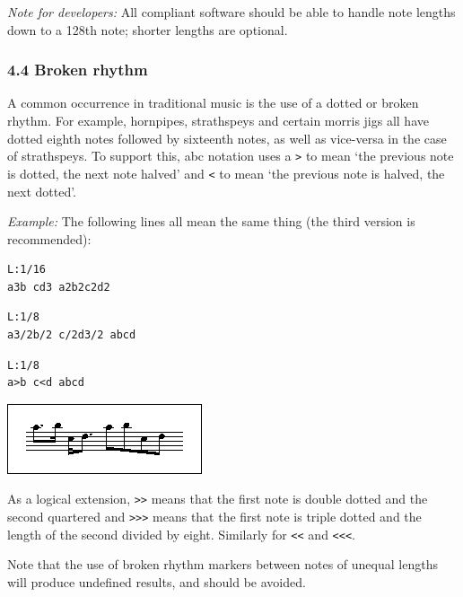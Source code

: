 \documentclass[oneside]{book}
\begin{document}
\emph{Note for developers:} All compliant software should be able to
handle note lengths down to a 128th note; shorter lengths are optional.

\hypertarget{broken_rhythm}{\subsubsection{4.4 Broken
rhythm}\label{broken_rhythm}}

A common occurrence in traditional music is the use of a dotted or
broken rhythm. For example, hornpipes, strathspeys and certain morris
jigs all have dotted eighth notes followed by sixteenth notes, as well
as vice-versa in the case of strathspeys. To support this, abc notation
uses a \texttt{\textgreater{}} to mean `the previous note is dotted, the
next note halved' and \texttt{\textless{}} to mean `the previous note is
halved, the next dotted'.

\emph{Example:} The following lines all mean the same thing (the third
version is recommended):

\begin{verbatim}
L:1/16
a3b cd3 a2b2c2d2
\end{verbatim}

\begin{verbatim}
L:1/8
a3/2b/2 c/2d3/2 abcd
\end{verbatim}

\begin{verbatim}
L:1/8
a>b c<d abcd
\end{verbatim}

\href{/wiki/_detail/abc:standard:broken-80.png?id=abc\%3Astandard\%3Av2.1}{\includegraphics{wiki/_media/abc-standard-broken-80.png}}

As a logical extension, \texttt{\textgreater{}\textgreater{}} means that
the first note is double dotted and the second quartered and
\texttt{\textgreater{}\textgreater{}\textgreater{}} means that the first
note is triple dotted and the length of the second divided by eight.
Similarly for \texttt{\textless{}\textless{}} and
\texttt{\textless{}\textless{}\textless{}}.

Note that the use of broken rhythm markers between notes of unequal
lengths will produce undefined results, and should be avoided.
\end{document}

